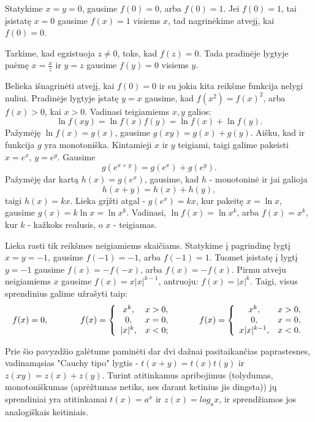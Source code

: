 \begin{sprendimas}
  Statykime $x=y=0$, gausime $f(0)=0$, arba $f(0)=1$. Jei $f(0)=1$, tai
  įsistatę $x=0$ gausime $f(x)=1$ visiems $x$, tad nagrinėkime atvejį, kai
  $f(0)=0$.

  Tarkime, kad egzistuoja $z\not=0$, toks, kad $f(z)=0$. Tada pradinėje
  lygtyje paėmę $x=\frac{x}{z}$ ir $y=z$ gausime $f(y)=0$ visiems $y$.

  Belieka išnagrinėti atvejį, kai $f(0)=0$ ir su jokia kita reikšme funkcija
  nelygi nuliui. Pradinėje lygtyje įstatę $y=x$ gausime, kad
  $f(x^{2})=f(x)^{2}$, arba $f(x)>0$, kai $x>0$. Vadinasi teigiamiems $x,y$
  galios:
  $$\ln f(xy)=\ln f(x)f(y)=\ln f(x) + \ln f(y).$$
  Pažymėję $\ln f(x)=g(x)$, gausime $g(xy)=g(x)+g(y)$. Aišku, kad ir funkcija
  $g$ yra monotoniška. Kintamieji $x$ ir $y$ teigiami, taigi galime pakeisti
  $x=e^{x}$, $y=e^{y}$. Gausime $$g(e^{x+y})=g(e^{x})+g(e^{y}).$$ Pažymėję dar
  kartą $h(x)=g(e^{x})$, gausime, kad $h$ - monotoninė ir jai galioja
  $$h(x+y)=h(x)+h(y),$$ taigi $h(x)=kx$. Lieka grįžti atgal - $g(e^{x})=kx$,
  kur pakeitę $x=\ln x$, gausime $g(x)=k \ln x=\ln x^{k}$. Vadinasi, $\ln
  f(x)=\ln x^{k}$, arba $f(x)=x^{k}$, kur  $k$ - kažkoks realusis, o $x$ -
  teigiamas.

  Lieka rasti tik reikšmes neigiamiems skaičiams. Statykime į pagrindinę lygtį
  $x=y=-1$, gausime $f(-1)=-1$, arba $f(-1)=1$. Tuomet įsistatę į lygtį $y=-1$
  gausime $f(x)=-f(-x)$, arba $f(x)=-f(x)$. Pirmu atveju neigiamiems $x$
  gausime $f(x)=x|x|^{k-1}$, antruoju: $f(x)=|x|^{k}$. Taigi, visus sprendinius
  galime užrašyti taip:
  $$f(x)=0,  \hspace{13 mm}
  f(x)=
  \left\{\begin{array}{cc}
    x^{k}, & x>0,\\
    0, & x=0,\\
    |x|^{k}, & x<0;\\
  \end{array}  \right.\hspace{10 mm}
  f(x)=
  \left\{\begin{array}{cc}
    x^{k}, & x>0,\\
    0, & x=0,\\
    x|x|^{k-1}, & x<0.\\
  \end{array}  \right. $$
  \mbox{}

\end{sprendimas}


Prie šio pavyzdžio galėtume paminėti dar dvi dažnai pasitaikančias
paprastesnes, vadinamąsias "Cauchy tipo" lygtis - $t(x+y)=t(x)t(y)$ ir
$z(xy)=z(x)+z(y)$. Turint atitinkamus apribojimus (tolydumas,
monotoniškumas (aprėžtumas netiks, nes darant ketinius jis dingsta)) jų
sprendiniai yra atitinkamai $t(x)=a^x$ ir $z(x)=log_a x$, ir sprendžiamos
jos analogiškais keitiniais.

